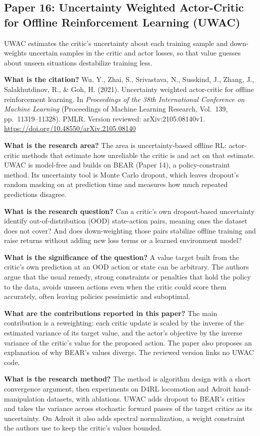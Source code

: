 \documentclass[11pt]{article}
\newcommand{\paper}[1]{\subsection*{#1}}
\newcommand{\q}[2]{\item \textbf{#1} #2}
\begin{document}
\paper{Paper 16: Uncertainty Weighted Actor-Critic for Offline Reinforcement Learning (UWAC)}
UWAC estimates the critic's uncertainty about each training sample and down-weights uncertain samples in the critic and actor losses, so that value guesses about unseen situations destabilize training less.
\begin{qna}

\q{What is the citation?}
Wu, Y., Zhai, S., Srivastava, N., Susskind, J., Zhang, J., Salakhutdinov, R., \& Goh, H. (2021). Uncertainty weighted actor-critic for offline reinforcement learning. In \emph{Proceedings of the 38th International Conference on Machine Learning} (Proceedings of Machine Learning Research, Vol.\ 139, pp.\ 11319--11328). PMLR. Version reviewed: arXiv:2105.08140v1. \url{https://doi.org/10.48550/arXiv.2105.08140}

\q{What is the research area?}
The area is uncertainty-based offline RL: actor-critic methods that estimate how unreliable the critic is and act on that estimate. UWAC is model-free and builds on BEAR (Paper 14), a policy-constraint method. Its uncertainty tool is Monte Carlo dropout, which leaves dropout's random masking on at prediction time and measures how much repeated predictions disagree.

\q{What is the research question?}
Can a critic's own dropout-based uncertainty identify out-of-distribution (OOD) state-action pairs, meaning ones the dataset does not cover? And does down-weighting those pairs stabilize offline training and raise returns without adding new loss terms or a learned environment model?

\q{What is the significance of the question?}
A value target built from the critic's own prediction at an OOD action or state can be arbitrary. The authors argue that the usual remedy, strong constraints or penalties that hold the policy to the data, avoids unseen actions even when the critic could score them accurately, often leaving policies pessimistic and suboptimal.

\q{What are the contributions reported in this paper?}
The main contribution is a reweighting: each critic update is scaled by the inverse of the estimated variance of its target value, and the actor's objective by the inverse variance of the critic's value for the proposed action. The paper also proposes an explanation of why BEAR's values diverge. The reviewed version links no UWAC code.

\q{What is the research method?}
The method is algorithm design with a short convergence argument, then experiments on D4RL locomotion and Adroit hand-manipulation datasets, with ablations. UWAC adds dropout to BEAR's critics and takes the variance across stochastic forward passes of the target critics as its uncertainty. On Adroit it also adds spectral normalization, a weight constraint the authors use to keep the critic's values bounded.


\end{qna}
\end{document}
